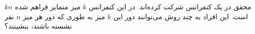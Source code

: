 \EXERCISE
$kn$
محقق در یک کنفرانس شرکت کرده‌اند. در این کنفرانس
$k$
میز متمایز فراهم شده است. این افراد به چند روش می‌توانند دور این 
$k$
میز به طوری که دور هر میز 
$n$
نفر نشسته باشند، بنشینند؟